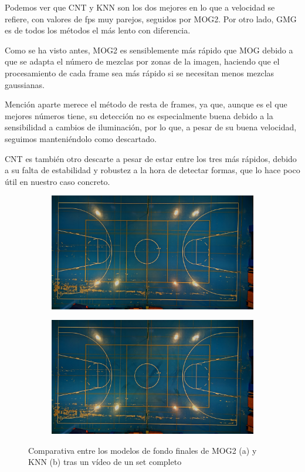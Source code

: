 Podemos ver que CNT y KNN son los dos mejores en lo que a velocidad se refiere, con valores de fps muy parejos, seguidos por MOG2. Por otro lado, GMG es de todos los métodos el más lento con diferencia.

Como se ha visto antes, MOG2 es sensiblemente más rápido que MOG debido a que se adapta el número de mezclas por zonas de la imagen, haciendo que el procesamiento de cada frame sea más rápido si se necesitan menos mezclas gaussianas.

Mención aparte merece el método de resta de frames, ya que, aunque es el que mejores números tiene, su detección no es especialmente buena debido a la sensibilidad a cambios de iluminación, por lo que, a pesar de su buena velocidad, seguimos manteniéndolo como descartado.

CNT es también otro descarte a pesar de estar entre los tres más rápidos, debido a su falta de estabilidad y robustez a la hora de detectar formas, que lo hace poco útil en nuestro caso concreto. 

\begin{figure}
\begin{subfigure}{.5\textwidth}
  \centering
  \includegraphics[width=.9\linewidth]{images/modeloMOG}
  \caption { }
  \label{fig:modelos1a}
\end{subfigure}%
\begin{subfigure}{.5\textwidth}
  \centering
  \includegraphics[width=.9\linewidth]{images/modeloKNN}
  \caption { }
  \label{fig:modelos1b}
\end{subfigure}
\caption{Comparativa entre los modelos de fondo finales de MOG2 (a) y KNN (b) tras un vídeo de un set completo }
\label{fig:modelos}
\end{figure}

